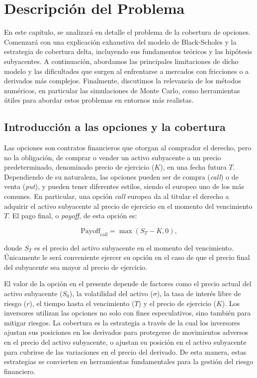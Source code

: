 \documentclass[11pt,a4paper,spanish]{article}
\numberwithin{equation}{section} %
\begin{document}
\section{Descripción del Problema}\label{sec:descripcion_problema}

En este capítulo, se analizará en detalle el problema de la cobertura de opciones. Comenzará con una explicación exhaustiva del modelo de Black-Scholes y la estrategia de cobertura delta, incluyendo sus fundamentos teóricos y las hipótesis subyacentes. A continuación, abordamos las principales limitaciones de dicho modelo y las dificultades que surgen al enfrentarse a mercados con fricciones o a derivados más complejos. Finalmente, discutimos la relevancia de los métodos numéricos, en particular las simulaciones de Monte Carlo, como herramientas útiles para abordar estos problemas en entornos más realistas.

\subsection{Introducción a las opciones y la cobertura}

Las opciones son contratos financieros que otorgan al comprador el derecho, pero no la obligación, de comprar o vender un activo subyacente a un precio predeterminado, denominado precio de ejercicio ($K$), en una fecha futura $T$. Dependiendo de su naturaleza, las opciones pueden ser de compra (\textit{call}) o de venta (\textit{put}), y pueden tener diferentes estilos, siendo el europeo uno de los más comunes. En particular, una opción \textit{call }europea da al titular el derecho a adquirir el activo subyacente al precio de ejercicio en el momento del vencimiento $T$. El pago final, o \textit{payoff}, de esta opción es:

\begin{equation}
\text{Payoff}_{\text{call}} = \max(S_T - K, 0),
\end{equation}


donde $S_T$ es el precio del activo subyacente en el momento del vencimiento. Únicamente le será conveniente ejercer su opción en el caso de que el precio final del subyacente sea mayor al precio de ejercicio. 

El valor de la opción en el presente depende de factores como el precio actual del activo subyacente ($S_0$), la volatilidad del activo ($\sigma$), la tasa de interés libre de riesgo ($r$), el tiempo hasta el vencimiento ($T$) y el precio de ejercicio ($K$). Los inversores utilizan las opciones no solo con fines especulativos, sino también para mitigar riesgos. La cobertura es la estrategia a través de la cual los inversores ajustan sus posiciones en los derivados para protegerse de movimientos adversos en el precio del activo subyacente, o ajustan su posición en el activo subyacente para cubrirse de las variaciones en el precio del derivado. De esta manera, estas estrategias se convierten en herramientas fundamentales para la gestión del riesgo financiero.
\end{document}
